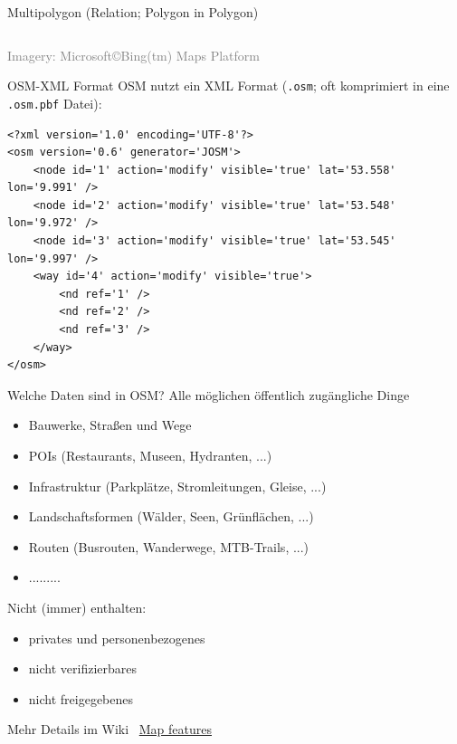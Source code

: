 \documentclass{beamer}
\begin{document}
\begin{frame}{Multipolygon (Relation; Polygon in Polygon)}
\begin{center}
\begin{columns}
\begin{column}{4cm}
						\end{column}
					\end{columns}
					\vspace{0.25cm}
					\textcolor{gray}{\tiny Imagery: Microsoft\copyright Bing(tm) Maps Platform}
				\end{center}
			\end{frame}
			
			\begin{frame}[fragile]{OSM-XML Format}
				OSM nutzt ein XML Format (\texttt{.osm}; oft komprimiert in eine \texttt{.osm.pbf} Datei):
				\vspace{0.25cm}
				{
					\scriptsize
					\begin{Verbatim}
<?xml version='1.0' encoding='UTF-8'?>
<osm version='0.6' generator='JOSM'>
    <node id='1' action='modify' visible='true' lat='53.558' lon='9.991' />
    <node id='2' action='modify' visible='true' lat='53.548' lon='9.972' />
    <node id='3' action='modify' visible='true' lat='53.545' lon='9.997' />
    <way id='4' action='modify' visible='true'>
        <nd ref='1' />
        <nd ref='2' />
        <nd ref='3' />
    </way>
</osm>
					\end{Verbatim}
				}
			\end{frame}
			
			\begin{frame}{Welche Daten sind in OSM?}
				Alle möglichen öffentlich zugängliche Dinge
				\begin{itemize}
					\item Bauwerke, Straßen und Wege
					\item POIs (Restaurants, Museen, Hydranten, ...)
					\item Infrastruktur (Parkplätze, Stromleitungen, Gleise, ...)
					\item Landschaftsformen (Wälder, Seen, Grünflächen, ...)
					\item Routen (Busrouten, Wanderwege, MTB-Trails, ...)
					\item .........
				\end{itemize}
				\pause
				Nicht (immer) enthalten:
				\begin{itemize}
					\item privates und personenbezogenes
					\item nicht verifizierbares
					\item nicht freigegebenes
				\end{itemize}
				\pause
				Mehr Details im Wiki \textrightarrow\ \href{https://wiki.openstreetmap.org/wiki/Map\_features}{Map features}
			\end{frame}
			
\end{document}
